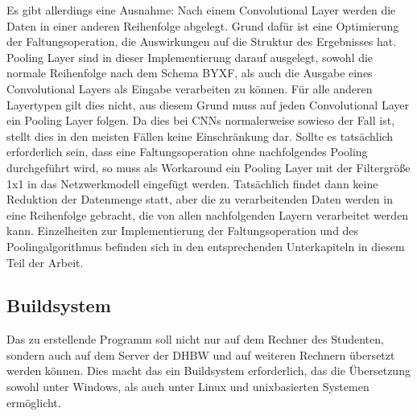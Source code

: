 \documentclass[../main.tex]{subfiles}
\begin{document}
Es gibt allerdings eine Ausnahme: Nach einem Convolutional Layer werden die Daten in einer anderen Reihenfolge abgelegt. Grund dafür ist eine Optimierung der Faltungsoperation, die Auswirkungen auf die Struktur des Ergebnisses hat. Pooling Layer sind in dieser Implementierung darauf ausgelegt, sowohl die normale Reihenfolge nach dem Schema BYXF, als auch die Ausgabe eines Convolutional Layers als Eingabe verarbeiten zu können. Für alle anderen Layertypen gilt dies nicht, aus diesem Grund muss auf jeden Convolutional Layer ein Pooling Layer folgen. Da dies bei CNNs normalerweise sowieso der Fall ist, stellt dies in den meisten Fällen keine Einschränkung dar. Sollte es tatsächlich erforderlich sein, dass eine Faltungsoperation ohne nachfolgendes Pooling durchgeführt wird, so muss als Workaround ein Pooling Layer mit der Filtergröße 1x1 in das Netzwerkmodell eingefügt werden. Tatsächlich findet dann keine Reduktion der Datenmenge statt, aber die zu verarbeitenden Daten werden in eine Reihenfolge gebracht, die von allen nachfolgenden Layern verarbeitet werden kann. Einzelheiten zur Implementierung der Faltungsoperation und des Poolingalgorithmus befinden sich in den entsprechenden Unterkapiteln in diesem Teil der Arbeit. 

\subsection{Buildsystem}
Das zu erstellende Programm soll nicht nur auf dem Rechner des Studenten, sondern auch auf dem Server der DHBW und auf weiteren Rechnern übersetzt werden können. Dies macht das ein Buildsystem erforderlich, das die Übersetzung sowohl unter Windows, als auch unter Linux und unixbasierten Systemen ermöglicht. 
\end{document}
